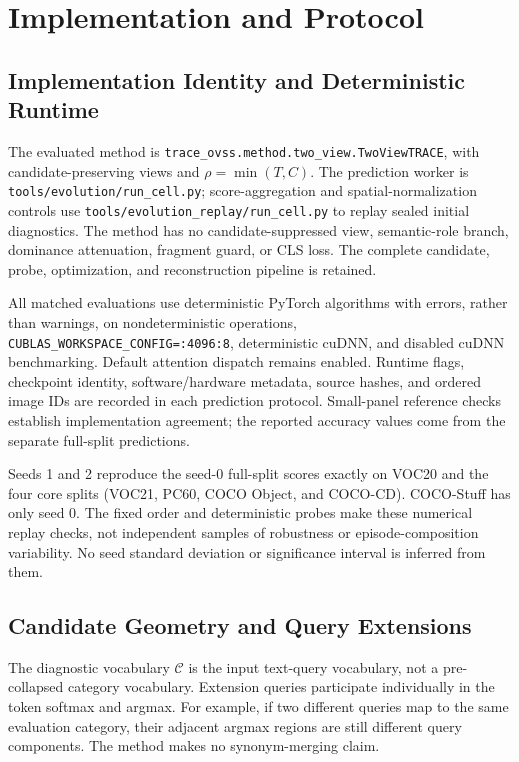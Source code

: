 \section{Implementation and Protocol}
\label{app:protocol}
\subsection{Implementation Identity and Deterministic Runtime}
The evaluated method is \texttt{trace\_ovss.method.two\_view.TwoViewTRACE}, with candidate-preserving views and $\rho=\min(T,C)$. The prediction worker is \texttt{tools/evolution/run\_cell.py}; score-aggregation and spatial-normalization controls use \texttt{tools/evolution\_replay/run\_cell.py} to replay sealed initial diagnostics. The method has no candidate-suppressed view, semantic-role branch, dominance attenuation, fragment guard, or CLS loss. The complete candidate, probe, optimization, and reconstruction pipeline is retained.

All matched evaluations use deterministic PyTorch algorithms with errors, rather than warnings, on nondeterministic operations, \texttt{CUBLAS\_WORKSPACE\_CONFIG=:4096:8}, deterministic cuDNN, and disabled cuDNN benchmarking. Default attention dispatch remains enabled. Runtime flags, checkpoint identity, software/hardware metadata, source hashes, and ordered image IDs are recorded in each prediction protocol. Small-panel reference checks establish implementation agreement; the reported accuracy values come from the separate full-split predictions.

Seeds 1 and 2 reproduce the seed-0 full-split scores exactly on VOC20 and the four core splits (VOC21, PC60, COCO Object, and COCO-CD). COCO-Stuff has only seed 0. The fixed order and deterministic probes make these numerical replay checks, not independent samples of robustness or episode-composition variability. No seed standard deviation or significance interval is inferred from them.



\subsection{Candidate Geometry and Query Extensions}
The diagnostic vocabulary $\mathcal C$ is the input text-query vocabulary, not a pre-collapsed category vocabulary. Extension queries participate individually in the token softmax and argmax. For example, if two different queries map to the same evaluation category, their adjacent argmax regions are still different query components. The method makes no synonym-merging claim.

